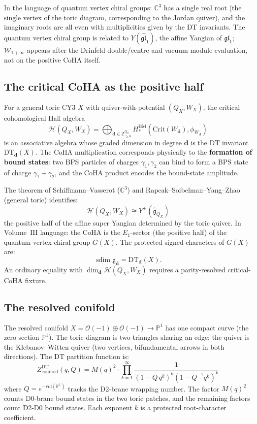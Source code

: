 \documentclass[11pt]{article}
\theoremstyle{definition}
\newcommand{\sdim}{\operatorname{sdim}}
\newcommand{\DT}{\mathrm{DT}}
\newcommand{\cO}{\mathcal{O}}
\newcommand{\bZ}{\mathbb{Z}}
\newcommand{\bC}{\mathbb{C}}
\begin{document}
In the language of quantum vertex chiral groups: $\bC^3$ has a single
real root (the single vertex of the toric diagram, corresponding to
the Jordan quiver), and the imaginary roots are all even with
multiplicities given by the DT invariants. The quantum vertex chiral
group is related to $Y(\widehat{\mathfrak{gl}}_1)$, the affine
Yangian of $\mathfrak{gl}_1$; $\mathcal{W}_{1+\infty}$ appears after
the Drinfeld-double/centre and vacuum-module evaluation, not on the
positive CoHA itself.

\subsection{The critical CoHA as the positive half}

For a general toric CY3 $X$ with quiver-with-potential $(Q_X, W_X)$,
the critical cohomological Hall algebra
\[
 \mathcal{H}(Q_X, W_X) = \bigoplus_{\mathbf{d} \in \bZ_{\geq 0}^{Q_0}}
 H^{\mathrm{BM}}_*(\mathrm{Crit}(W_\mathbf{d}), \phi_{W_\mathbf{d}})
\]
is an associative algebra whose graded dimension in degree $\mathbf{d}$
is the DT invariant $\DT_\mathbf{d}(X)$. The CoHA multiplication
corresponds physically to the \textbf{formation of bound states}: two
BPS particles of charges $\gamma_1, \gamma_2$ can bind to form a BPS
state of charge $\gamma_1 + \gamma_2$, and the CoHA product encodes
the bound-state amplitude.

The theorem of Schiffmann--Vasserot ($\bC^3$) and
Rapcak--Soibelman--Yang--Zhao (general toric) identifies:
\begin{equation}
\label{eq:coha-yangian}
 \mathcal{H}(Q_X, W_X) \cong Y^+(\widehat{\mathfrak{g}}_{Q_X})
\end{equation}
the positive half of the affine super Yangian determined by the
toric quiver. In Volume~III language: the CoHA is the $E_1$-sector
(the positive half) of the quantum vertex chiral group $G(X)$. The
protected signed characters of $G(X)$ are:
\[
 \sdim\mathfrak g_{\mathbf{d}} = \DT_\mathbf{d}(X).
\]
An ordinary equality with
\(\dim_{\mathbf d}\mathcal H(Q_X,W_X)\) requires a parity-resolved
critical-CoHA fixture.

\subsection{The resolved conifold}

The resolved conifold $X = \cO(-1) \oplus \cO(-1) \to \mathbb{P}^1$
has one compact curve (the zero section $\mathbb{P}^1$). The toric
diagram is two triangles sharing an edge; the quiver is the
Klebanov--Witten quiver (two vertices, bifundamental arrows in both
directions). The DT partition function is:
\[
 Z^{\DT}_{\mathrm{conifold}}(q, Q) = M(q)^2 \cdot
 \prod_{k=1}^\infty
 \frac{1}{(1 - Q \, q^k)^k (1 - Q^{-1} q^k)^k}
\]
where $Q = e^{-\mathrm{vol}(\mathbb{P}^1)}$ tracks the D2-brane
wrapping number. The factor $M(q)^2$ counts D0-brane bound states
in the two toric patches, and the remaining factors count D2-D0
bound states. Each exponent $k$ is a protected root-character
coefficient.
\end{document}

